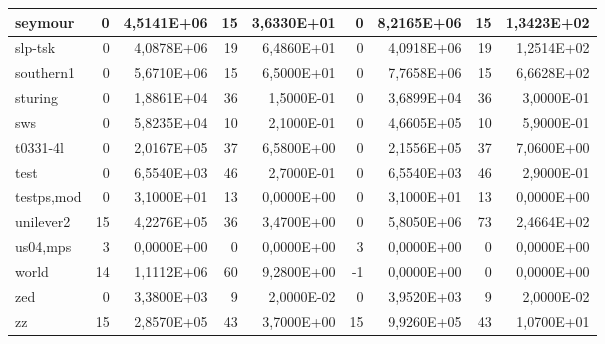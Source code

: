 \begin{tabular}{|l|r|r|r|r|r|r|r|r|}
seymour & 0 & 4,5141E+06 & 15 & 3,6330E+01 & 0 & 8,2165E+06 & 15 & 1,3423E+02 \\ \hline
slp-tsk & 0 & 4,0878E+06 & 19 & 6,4860E+01 & 0 & 4,0918E+06 & 19 & 1,2514E+02 \\ \hline
southern1 & 0 & 5,6710E+06 & 15 & 6,5000E+01 & 0 & 7,7658E+06 & 15 & 6,6628E+02 \\ \hline
sturing & 0 & 1,8861E+04 & 36 & 1,5000E-01 & 0 & 3,6899E+04 & 36 & 3,0000E-01 \\ \hline
sws & 0 & 5,8235E+04 & 10 & 2,1000E-01 & 0 & 4,6605E+05 & 10 & 5,9000E-01 \\ \hline
t0331-4l & 0 & 2,0167E+05 & 37 & 6,5800E+00 & 0 & 2,1556E+05 & 37 & 7,0600E+00 \\ \hline
test & 0 & 6,5540E+03 & 46 & 2,7000E-01 & 0 & 6,5540E+03 & 46 & 2,9000E-01 \\ \hline
testps,mod & 0 & 3,1000E+01 & 13 & 0,0000E+00 & 0 & 3,1000E+01 & 13 & 0,0000E+00 \\ \hline
unilever2 & 15 & 4,2276E+05 & 36 & 3,4700E+00 & 0 & 5,8050E+06 & 73 & 2,4664E+02 \\ \hline
us04,mps & 3 & 0,0000E+00 & 0 & 0,0000E+00 & 3 & 0,0000E+00 & 0 & 0,0000E+00 \\ \hline
world & 14 & 1,1112E+06 & 60 & 9,2800E+00 & -1 & 0,0000E+00 & 0 & 0,0000E+00 \\ \hline
zed & 0 & 3,3800E+03 & 9 & 2,0000E-02 & 0 & 3,9520E+03 & 9 & 2,0000E-02 \\ \hline
zz & 15 & 2,8570E+05 & 43 & 3,7000E+00 & 15 & 9,9260E+05 & 43 & 1,0700E+01 \\ \hline
\end{tabular}
